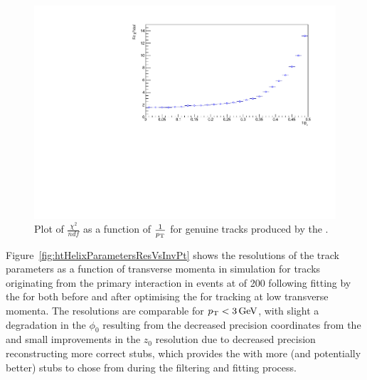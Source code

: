 \begin{figure}[tbp]
\centering
\includegraphics[width=\textwidth]{figs/tk-upgrade/results-lowPtTracking/kfChi2NdfVsInvPtFlatGeometry_5000.pdf}
\caption{Plot of $\frac{\chi^{2}}{ndf}$ as a function of $\frac{1}{p_{\mathrm{T}}}$ for genuine tracks produced by the \KF.}
\label{fig:2GeVFlatChi2Ndf}
\end{figure}

Figure~\ref{fig:htHelixParametersResVsInvPt} shows the resolutions of the track parameters as a function of transverse momenta in simulation for tracks originating from the primary interaction in \ttbar events at \PU of 200 following fitting by the \KF for both before and after optimising the \HT for tracking at low transverse momenta.
The resolutions are comparable for $p_{\mathrm{T}} < 3\,\text{Ge\hspace{-.08em}V}$, with slight a degradation in the $\phi_{0}$ resulting from the decreased precision coordinates from the \HT and small improvements in the $z_{0}$ resolution due to decreased precision \HT reconstructing more correct stubs, which provides the \KF with more (and potentially better) stubs to chose from during the filtering and fitting process.

